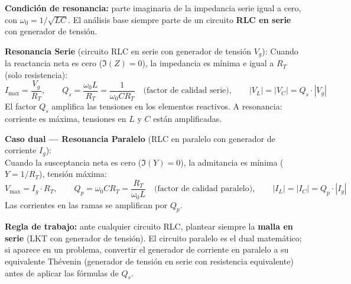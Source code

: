 \documentclass[12pt,a4paper]{article}
\begin{document}
\textbf{Condición de resonancia:} parte imaginaria de la impedancia serie igual a cero,
con $\omega_0 = 1/\!\sqrt{LC}$. El análisis base siempre parte de un circuito
\textbf{RLC en serie} con generador de tensión.

\begin{formulabox}
\textbf{Resonancia Serie} (circuito RLC en serie con generador de tensión $V_g$):
Cuando la reactancia neta es cero ($\Im(Z) = 0$), la impedancia es mínima e igual a $R_T$ (solo resistencia):
\[
  I_{\max} = \frac{V_g}{R_T}, \qquad
  Q_s = \frac{\omega_0 L}{R_T} = \frac{1}{\omega_0 C R_T} \quad\text{(factor de calidad serie)}, \qquad
  |V_L| = |V_C| = Q_s\cdot|V_g|
\]
El factor $Q_s$ amplifica las tensiones en los elementos reactivos. A resonancia: corriente es máxima, tensiones en $L$ y $C$ están amplificadas.

\medskip
\textbf{Caso dual — Resonancia Paralelo} (RLC en paralelo con generador de corriente $I_g$):\\[4pt]
Cuando la susceptancia neta es cero ($\Im(Y) = 0$), la admitancia es mínima ($Y = 1/R_T$), tensión máxima:
\[
  V_{\max} = I_g\cdot R_T, \qquad
  Q_p = \omega_0 C R_T = \frac{R_T}{\omega_0 L} \quad\text{(factor de calidad paralelo)}, \qquad
  |I_L| = |I_C| = Q_p\cdot|I_g|
\]
Las corrientes en las ramas se amplifican por $Q_p$.
\end{formulabox}

\begin{warnbox}
\textbf{\color{warnorangeline}Regla de trabajo:} ante cualquier circuito RLC,
plantear siempre la \textbf{malla en serie} (LKT con generador de tensión).
El circuito paralelo es el dual matemático; si aparece en un problema,
convertir el generador de corriente en paralelo a su equivalente Thévenin
(generador de tensión en serie con resistencia equivalente) antes de aplicar las fórmulas de $Q_s$.
\end{warnbox}
\end{document}
